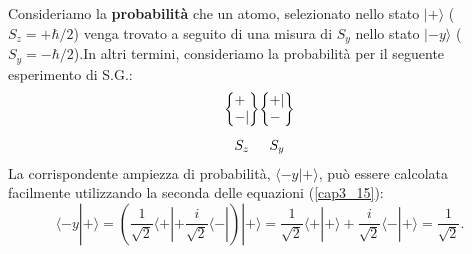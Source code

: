 \documentclass[a4paper,12pt,oneside]{book}
\begin{document}
Consideriamo la \textbf{probabilità} che un atomo, selezionato nello stato $| + \rangle$ ($S_z=+\hbar/2$) venga trovato a seguito di una misura di $S_y$ nello stato $| -y \rangle$ ($S_y=-\hbar/2$).In altri termini, consideriamo la probabilità per il seguente esperimento di S.G.:
	\begin{equation}
		\begin{matrix}
		\begin{Bmatrix}
		 +\makebox[\widthof{$|$}]{$\ $} \\ - |  
		\end{Bmatrix} \\[0.5cm]
		S_z
		\end{matrix}
		\begin{matrix}
		\begin{Bmatrix}
		 + | \\ - \makebox[\widthof{$|$}]{$\ $} 
		\end{Bmatrix}\\[0.5cm]
		S_y
		\end{matrix}
	\end{equation}
La corrispondente ampiezza di probabilità, $\langle -y | + \rangle$, può essere calcolata facilmente utilizzando la seconda delle equazioni (\ref{cap3_15}):
	\begin{equation}
		\langle -y | + \rangle = \left( \frac{1}{\sqrt{2}}\langle + |  + \frac{i}{\sqrt{2}}\langle - |  \right ) |+ \rangle = \frac{1}{\sqrt{2}}\langle + | + \rangle +\frac{i}{\sqrt{2}}\langle - | + \rangle = \frac{1}{\sqrt{2}} .
	\end{equation}\\
\end{document}
